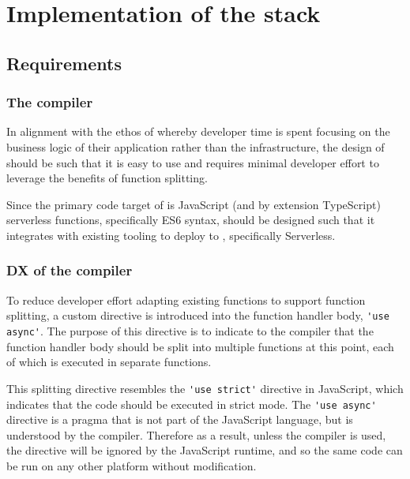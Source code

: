 \chapter{Implementation of the \faaas{} stack}

\section{Requirements}

\cprotect\subsection{The \faaasc{} compiler}
In alignment with the ethos of \faas{} whereby developer time is spent focusing on the business logic of their application rather than the infrastructure, the design of \faaasc{} should be such that it is easy to use and requires minimal developer effort to leverage the benefits of function splitting.

Since the primary code target of \faaasc{} is JavaScript (and by extension TypeScript) serverless functions, specifically ES6 syntax, \faaasc{} should be designed such that it integrates with existing tooling to deploy to \awslambda{}, specifically Serverless\cite{serverlessServerlessZeroFrictionServerless2024}.

\cprotect\subsection{DX of the \faaasc{} compiler}

To reduce developer effort adapting existing functions to support function splitting, a custom directive is introduced into the function handler body, \verb|'use async'|. The purpose of this directive is to indicate to the \faaasc{} compiler that the function handler body should be split into multiple functions at this point, each of which is executed in separate \awslambda{} functions.

This splitting directive resembles the \verb|'use strict'| directive in JavaScript, which indicates that the code should be executed in strict mode. The \verb|'use async'| directive is a pragma that is not part of the JavaScript language, but is understood by the \faaasc{} compiler. Therefore as a result, unless the \faaasc{} compiler is used, the directive will be ignored by the JavaScript runtime, and so the same code can be run on any other \faas{} platform without modification.

